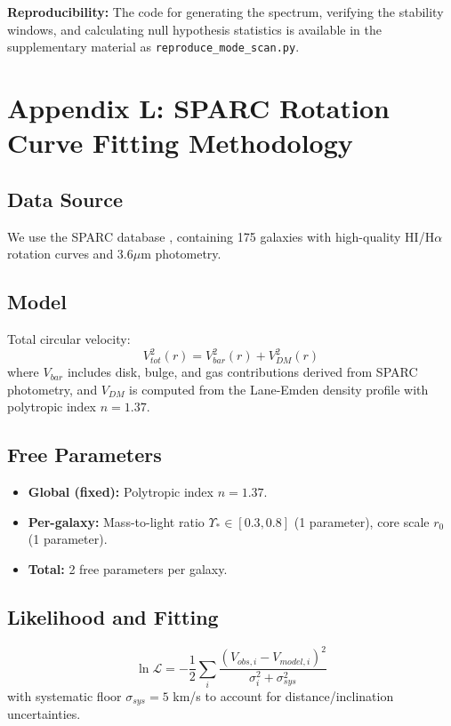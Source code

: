 \documentclass[a4paper,12pt]{article}
\begin{document}
\textbf{Reproducibility:} The code for generating the spectrum, verifying the stability windows, and calculating null hypothesis statistics is available in the supplementary material as \texttt{reproduce\_mode\_scan.py}.



\newpage
\section{Appendix L: SPARC Rotation Curve Fitting Methodology}

\subsection{Data Source}
We use the SPARC database \cite{lelli}, containing 175 galaxies with high-quality HI/H$\alpha$ rotation curves and 3.6$\mu$m photometry.

\subsection{Model}
Total circular velocity:
\begin{equation}
V_{tot}^2(r) = V_{bar}^2(r) + V_{DM}^2(r)
\end{equation}
where $V_{bar}$ includes disk, bulge, and gas contributions derived from SPARC photometry, and $V_{DM}$ is computed from the Lane-Emden density profile with polytropic index $n = 1.37$.

\subsection{Free Parameters}
\begin{itemize}
\item \textbf{Global (fixed):} Polytropic index $n = 1.37$.
\item \textbf{Per-galaxy:} Mass-to-light ratio $\Upsilon_* \in [0.3, 0.8]$ (1 parameter), core scale $r_0$ (1 parameter).
\item \textbf{Total:} 2 free parameters per galaxy.
\end{itemize}

\subsection{Likelihood and Fitting}
\begin{equation}
\ln \mathcal{L} = -\frac{1}{2} \sum_i \frac{(V_{obs,i} - V_{model,i})^2}{\sigma_i^2 + \sigma_{sys}^2}
\end{equation}
with systematic floor $\sigma_{sys} = 5$ km/s to account for distance/inclination uncertainties.
\end{document}
